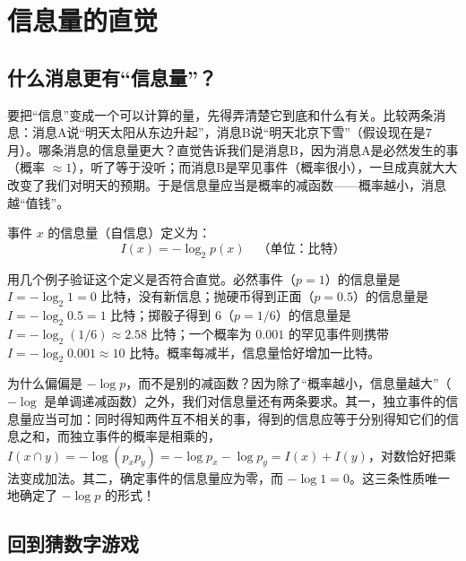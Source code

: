 \section{信息量的直觉}

\subsection{什么消息更有“信息量”？}

要把“信息”变成一个可以计算的量，先得弄清楚它到底和什么有关。比较两条消息：消息A说“明天太阳从东边升起”，消息B说“明天北京下雪”（假设现在是7月）。哪条消息的信息量更大？直觉告诉我们是消息B，因为消息A是必然发生的事（概率 $\approx 1$），听了等于没听；而消息B是罕见事件（概率很小），一旦成真就大大改变了我们对明天的预期。于是信息量应当是概率的减函数——概率越小，消息越“值钱”。

\begin{keyformula}[title=单个事件的信息量]
事件 $x$ 的信息量（自信息）定义为：
\begin{equation}
I(x) = -\log_2 p(x) \quad \text{（单位：比特）}
\end{equation}
\end{keyformula}

用几个例子验证这个定义是否符合直觉。必然事件（$p=1$）的信息量是 $I = -\log_2 1 = 0$ 比特，没有新信息；抛硬币得到正面（$p=0.5$）的信息量是 $I = -\log_2 0.5 = 1$ 比特；掷骰子得到 6（$p=1/6$）的信息量是 $I = -\log_2(1/6) \approx 2.58$ 比特；一个概率为 $0.001$ 的罕见事件则携带 $I = -\log_2 0.001 \approx 10$ 比特。概率每减半，信息量恰好增加一比特。

\begin{physicalmeaning}
为什么偏偏是 $-\log p$，而不是别的减函数？因为除了“概率越小，信息量越大”（$-\log$ 是单调递减函数）之外，我们对信息量还有两条要求。其一，独立事件的信息量应当可加：同时得知两件互不相关的事，得到的信息应等于分别得知它们的信息之和，而独立事件的概率是相乘的，$I(x \cap y) = -\log(p_x p_y) = -\log p_x - \log p_y = I(x) + I(y)$，对数恰好把乘法变成加法。其二，确定事件的信息量应为零，而 $-\log 1 = 0$。这三条性质唯一地确定了 $-\log p$ 的形式！
\end{physicalmeaning}

\subsection{回到猜数字游戏}


